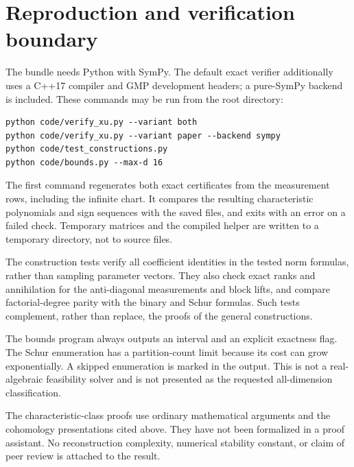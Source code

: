 \documentclass[11pt]{article}
\theoremstyle{definition}
\begin{document}
\section{Reproduction and verification boundary}\label{sec:reproduce}
The bundle needs Python with SymPy. The default exact verifier additionally uses a C++17 compiler and GMP development headers; a pure-SymPy backend is included. These commands may be run from the root directory:
\begin{lstlisting}
python code/verify_xu.py --variant both
python code/verify_xu.py --variant paper --backend sympy
python code/test_constructions.py
python code/bounds.py --max-d 16
\end{lstlisting}
The first command regenerates both exact certificates from the measurement rows, including the infinite chart. It compares the resulting characteristic polynomials and sign sequences with the saved files, and exits with an error on a failed check. Temporary matrices and the compiled helper are written to a temporary directory, not to source files.

The construction tests verify all coefficient identities in the tested norm formulas, rather than sampling parameter vectors. They also check exact ranks and annihilation for the anti-diagonal measurements and block lifts, and compare factorial-degree parity with the binary and Schur formulas. Such tests complement, rather than replace, the proofs of the general constructions.

The bounds program always outputs an interval and an explicit exactness flag. The Schur enumeration has a partition-count limit because its cost can grow exponentially. A skipped enumeration is marked in the output. This is not a real-algebraic feasibility solver and is not presented as the requested all-dimension classification.

The characteristic-class proofs use ordinary mathematical arguments and the cohomology presentations cited above. They have not been formalized in a proof assistant. No reconstruction complexity, numerical stability constant, or claim of peer review is attached to the result.

\clearpage
\appendix
\end{document}

